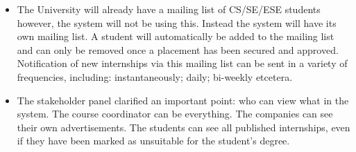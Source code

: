 \documentclass{l3deliverable}
\begin{document}
\begin{itemize}
\item The University will already have a mailing list of CS/SE/ESE students
however, the system will not be using this. Instead the system will have its
own mailing list. A student will automatically be added to the mailing list
and can only be removed once a placement has been secured and approved.
Notification of new internships via this mailing list can be sent in a variety
of frequencies, including: instantaneously; daily; bi-weekly etcetera.

\item The stakeholder panel clarified an important point: who can view what
in the system. The course coordinator can be everything. The companies can see
their own advertisements. The students can see all published internships, even
if they have been marked as unsuitable for the student's degree.

\end{itemize}

\end{document}
